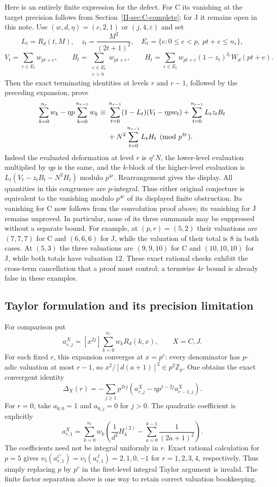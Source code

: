 \documentclass[11pt,letterpaper]{article}
\numberwithin{equation}{section}
\begin{document}
Here is an entirely finite expression for the defect. For C its vanishing at the target precision follows from Section~\ref{II-sec:C-complete}; for J it remains open in this note.
Use $(w,d,\eta)=(c,2,1)$ or $(j,4,\varepsilon)$ and set
\[
 L_t=R_d(t,M),\quad z_t=\frac{M^2}{(2t+1)^2},\quad
 E_t=\{e:0\le e<p,\ pt+e\le n_r\},
\]
\[
 V_t=\sum_{e\in E_t}w_{pt+e},\qquad
 B_t=\sum_{\substack{e\in E_t\\e>h}}w_{pt+e},\qquad
 H_t=\sum_{e\in E_t}w_{pt+e}(1-z_t)^{\delta_e}W_d(pt+e).
\]
Then the exact terminating identities at levels $r$ and $r-1$, followed
by the preceding expansion, prove
\begin{align}
 \sum_{k=0}^{n_r}w_k-\eta p\sum_{k=0}^{n_{r-1}}w_k
 \equiv{}&\sum_{t=0}^{n_{r-1}}(1-L_t)(V_t-\eta p w_t)
 +\sum_{t=0}^{n_{r-1}}L_t z_t B_t\notag\\
 &+N^2\sum_{t=0}^{n_{r-1}}L_tH_t\pmod{p^{4r}}.
\end{align}
Indeed the evaluated deformation at level $r$ is $\eta^rN$, the
lower-level evaluation multiplied by $\eta p$ is the same, and the
$k$-block of the higher-level evaluation is
$L_t(V_t-z_tB_t-N^2H_t)$ modulo $p^{4r}$. Rearrangement gives the display.
All quantities in this congruence are $p$-integral. Thus either original
conjecture is equivalent to the vanishing modulo $p^{4r}$ of its displayed
finite obstruction. Its vanishing for C now follows from the convolution proof above; its vanishing for J remains unproved. In particular,
none of its three summands may be suppressed without a separate bound.
For example, at $(p,r)=(5,2)$ their valuations are $(7,7,7)$ for C
and $(6,6,6)$ for J, while the valuation of their total is $8$ in both
cases. At $(5,3)$ the three valuations are $(9,9,10)$ for C and
$(10,10,10)$ for J, while both totals have valuation $12$. These exact
rational checks exhibit the cross-term cancellation that a proof must
control; a termwise $4r$ bound is already false in these examples.

\subsection{Taylor formulation and its precision limitation}
For comparison put
\[
 a^{X}_{r,j}=[x^{2j}]\sum_{k=0}^{n_r}w_kR_d(k,x),
 \qquad X=C,J.
\]
For each fixed $r$, this expansion converges at $x=p^r$: every denominator
has $p$-adic valuation at most $r-1$, so $x^2/[d(a+1)]^2\in p^2\mathbb Z_p$.
One obtains the exact convergent identity
\[
 \Delta_X(r)=-\sum_{j\ge1}p^{2rj}
 \left(a^X_{r,j}-\eta p^{1-2j}a^X_{r-1,j}\right).
\]
For $r=0$, take $a_{0,0}=1$ and $a_{0,j}=0$ for $j>0$.
The quadratic coefficient is explicitly
\[
 a^X_{r,1}=\sum_{k=0}^{n_r}w_k
 \left(\frac1{d^2}H_k^{(2)}-
 \sum_{a=0}^{k-1}\frac1{(2a+1)^2}\right).
\]
The coefficients need not be integral uniformly in $r$. Exact rational
calculation for $p=5$ gives $v_5(a^C_{r,1})=v_5(a^J_{r,1})=2,1,0,-1$
for $r=1,2,3,4$, respectively. Thus simply replacing $p$ by $p^r$ in the
first-level integral Taylor argument is invalid. The finite factor
separation above is one way to retain correct valuation bookkeeping.
\end{document}
